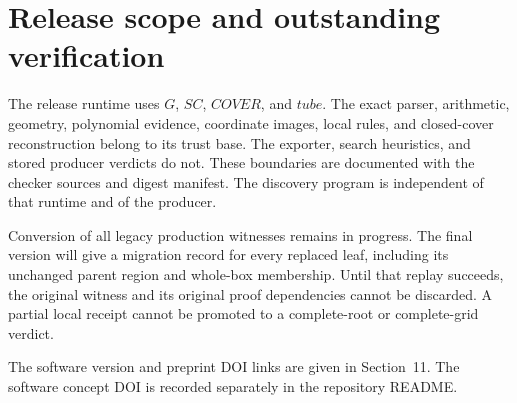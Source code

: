 \documentclass[11pt]{amsart}
\theoremstyle{definition}
\theoremstyle{remark}
\begin{document}
\appendix
\section{Release scope and outstanding verification}\label{app:release}

The release runtime uses $G$, $SC$, $COVER$, and $tube$. The exact
parser, arithmetic, geometry, polynomial evidence, coordinate images,
local rules, and closed-cover reconstruction belong to its trust base.
The exporter, search heuristics, and stored producer verdicts do not.
These boundaries are documented with the checker sources and digest
manifest. The discovery program is independent of that runtime and of the
producer.

Conversion of all legacy production witnesses remains in progress. The
final version will give a migration record for every replaced leaf,
including its unchanged parent region and whole-box membership. Until
that replay succeeds, the original witness and its original proof
dependencies cannot be discarded. A partial local receipt cannot be
promoted to a complete-root or complete-grid verdict.

The software version and preprint DOI links are given in Section~11.
The software concept DOI is recorded separately in the repository README.


\end{document}
